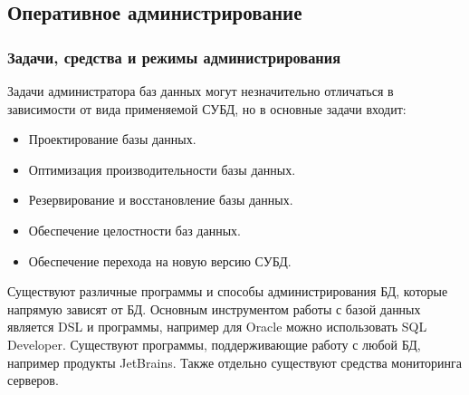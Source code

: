 \subsection{Оперативное администрирование}
\subsubsection{Задачи, средства и режимы администрирования}

Задачи администратора баз данных могут незначительно отличаться в зависимости от вида применяемой СУБД, но в основные задачи входит:
\begin{itemize}
    \item Проектирование базы данных.
    \item Оптимизация производительности базы данных.
    \item Резервирование и восстановление базы данных.
    \item Обеспечение целостности баз данных.
    \item Обеспечение перехода на новую версию СУБД.
\end{itemize}
Существуют различные программы и способы администрирования БД, которые напрямую зависят от БД. Основным инструментом работы с базой данных является DSL и программы, например для Oracle можно использовать SQL Developer. Существуют программы, поддерживающие работу с любой БД, например продукты JetBrains.  Также отдельно существуют средства мониторинга серверов.
